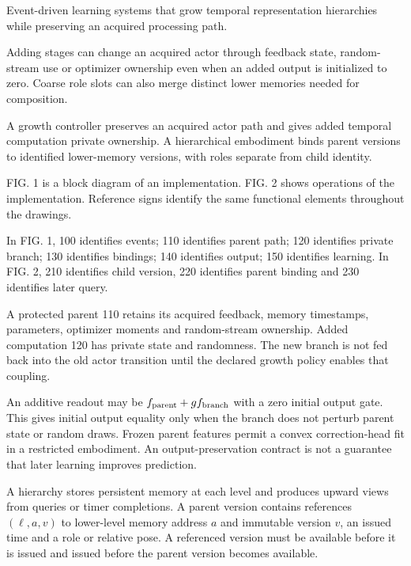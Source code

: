 \documentclass[pct]{sm-patent}
\begin{document}
\descriptionstart


\pnum Event-driven learning systems that grow temporal representation hierarchies while preserving an acquired processing path.


\pnum Adding stages can change an acquired actor through feedback state, random-stream use or optimizer ownership even when an added output is initialized to zero. Coarse role slots can also merge distinct lower memories needed for composition.


\pnum A growth controller preserves an acquired actor path and gives added temporal computation private ownership. A hierarchical embodiment binds parent versions to identified lower-memory versions, with roles separate from child identity.


\pnum FIG. 1 is a block diagram of an implementation. FIG. 2 shows operations of the implementation. Reference signs identify the same functional elements throughout the drawings.


\pnum In FIG. 1, 100 identifies events; 110 identifies parent path; 120 identifies private branch; 130 identifies bindings; 140 identifies output; 150 identifies learning. In FIG. 2, 210 identifies child version, 220 identifies parent binding and 230 identifies later query.

\pnum A protected parent 110 retains its acquired feedback, memory timestamps, parameters, optimizer moments and random-stream ownership. Added computation 120 has private state and randomness. The new branch is not fed back into the old actor transition until the declared growth policy enables that coupling.

\pnum An additive readout may be $f_{\rm parent}+g f_{\rm branch}$ with a zero initial output gate. This gives initial output equality only when the branch does not perturb parent state or random draws. Frozen parent features permit a convex correction-head fit in a restricted embodiment. An output-preservation contract is not a guarantee that later learning improves prediction.

\pnum A hierarchy stores persistent memory at each level and produces upward views from queries or timer completions. A parent version contains references $(\ell,a,v)$ to lower-level memory address $a$ and immutable version $v$, an issued time and a role or relative pose. A referenced version must be available before it is issued and issued before the parent version becomes available.
\end{document}
